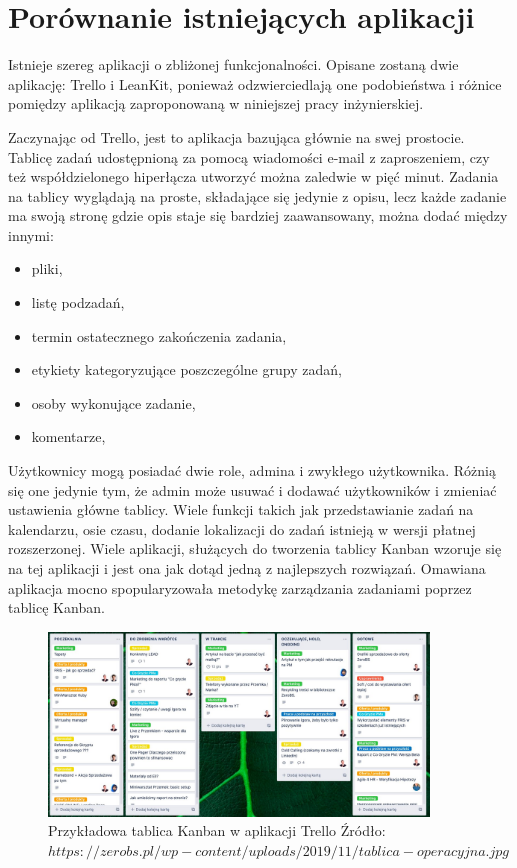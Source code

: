 \section{Porównanie istniejących aplikacji}
Istnieje szereg aplikacji o zbliżonej funkcjonalności. Opisane zostaną dwie aplikację: Trello i LeanKit,  ponieważ odzwierciedlają one podobieństwa i różnice pomiędzy aplikacją zaproponowaną w niniejszej pracy inżynierskiej.


Zaczynając od Trello, jest to aplikacja bazująca głównie na swej prostocie. Tablicę zadań udostępnioną za pomocą wiadomości e-mail z zaproszeniem, czy też współdzielonego hiperłącza utworzyć można zaledwie w pięć minut. Zadania na tablicy wyglądają na proste, składające się jedynie z opisu, lecz każde zadanie ma swoją stronę gdzie opis staje się bardziej zaawansowany, można dodać między innymi:
\begin{itemize}
	\item pliki, 
	\item listę podzadań,
	\item termin ostatecznego zakończenia zadania,
	\item etykiety kategoryzujące poszczególne grupy zadań,
	\item osoby wykonujące zadanie,
	\item komentarze,
\end{itemize}
Użytkownicy mogą posiadać dwie role, admina i zwykłego użytkownika. Różnią się one jedynie tym, że admin może usuwać i dodawać użytkowników i zmieniać ustawienia główne tablicy. Wiele funkcji takich jak przedstawianie zadań na kalendarzu, osie czasu, dodanie lokalizacji do zadań istnieją w wersji płatnej rozszerzonej. Wiele aplikacji, służących do tworzenia tablicy Kanban wzoruje się na tej aplikacji i jest ona jak dotąd jedną z najlepszych rozwiązań. Omawiana aplikacja mocno spopularyzowała metodykę zarządzania zadaniami poprzez tablicę Kanban.

\begin{figure}[h]
	\centering
	\includegraphics[width=0.90\textwidth]{tablica-operacyjna}		
	\caption{Przykładowa tablica Kanban w aplikacji Trello \newline Źródło: $https://zerobs.pl/wp-content/uploads/2019/11/tablica-operacyjna.jpg $}
\end{figure}

